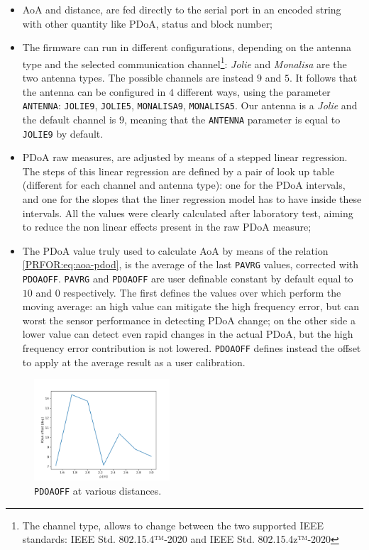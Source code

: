 \begin{itemize}
    \item AoA and distance, are fed directly to the serial port in an encoded string with other quantity like PDoA, status and block number;
    \item The firmware can run in different configurations, depending on the antenna type and the selected communication channel\footnote{The channel type, allows to change between the two supported IEEE standards: IEEE Std. 802.15.4™‐2020\cite{IEEEstd_4} and IEEE Std. 802.15.4z™‐2020\cite{IEEEstd_4z}}: \textit{Jolie} and \textit{Monalisa} are the two antenna types. The possible channels are instead $9$ and $5$. It follows that the antenna can be configured in $4$ different ways, using the parameter \texttt{ANTENNA}: \texttt{JOLIE9}, \texttt{JOLIE5}, \texttt{MONALISA9}, \texttt{MONALISA5}. Our antenna is a \textit{Jolie} and the default channel is $9$, meaning that the \texttt{ANTENNA} parameter is equal to \texttt{JOLIE9} by default. 
    \item PDoA raw measures, are adjusted by means of a stepped linear regression. The steps of this linear regression are defined by a pair of look up table (different for each channel and antenna type): one for the PDoA intervals, and one for the slopes that the liner regression model has to have inside these intervals. All the values were clearly calculated after laboratory test, aiming to reduce the non linear effects present in the raw PDoA measure; 
    \item The PDoA value truly used to calculate AoA by means of the relation \eqref{PRFOR:eq:aoa-pdod}, is the average of the last \texttt{PAVRG} values, corrected with \texttt{PDOAOFF}. \texttt{PAVRG} and \texttt{PDOAOFF} are user definable constant by default equal to $10$ and $0$ respectively. The first defines the values over which perform the moving average: an high value can mitigate the high frequency error, but can worst the sensor performance in detecting PDoA change; on the other side a lower value can detect even rapid changes in the actual PDoA, but the high frequency error contribution is not lowered. \texttt{PDOAOFF} defines instead the offset to apply at the average result as a user calibration.
\end{itemize}

\begin{figure}
    \centering
    \includegraphics[width=0.45\textwidth]{images/PDOAOFF_trend.png}
    \caption{\texttt{PDOAOFF} at various distances.}
    \label{UWB:fig:PDOAFF}
\end{figure}


